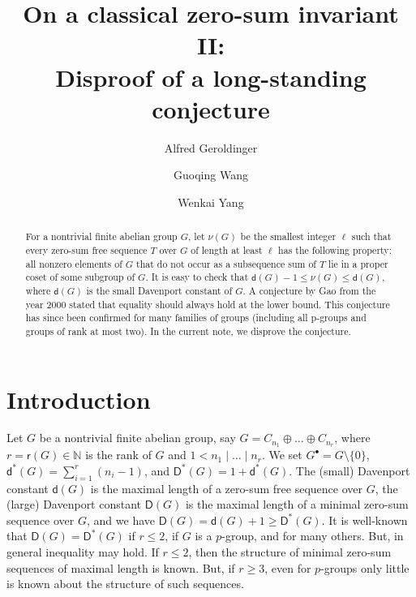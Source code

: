 \documentclass[11pt,a4paper]{amsart}
\title{On a classical zero-sum invariant II: \\ Disproof of a long-standing conjecture}
\author{Alfred Geroldinger \and Guoqing Wang \and Wenkai Yang}
\theoremstyle{plain}
\theoremstyle{definition}
\begin{document}
\maketitle

\begin{abstract}
For a nontrivial finite abelian group $G$, let $\nu(G)$ be the smallest  integer
$\ell$ such that every zero-sum free sequence $T$ over $G$ of length at least $\ell$ has the following property: all nonzero elements of $G$ that do not occur as a subsequence sum of $T$ lie in a proper coset of some subgroup of $G$. It is easy to check that $\mathsf d (G)-1 \le \nu (G) \le \mathsf d (G)$, where $\mathsf d (G)$ is the small Davenport constant of $G$. A conjecture by Gao from the year 2000 stated that equality should always hold at the lower bound. This conjecture has since been confirmed for many families of groups (including all p-groups and groups of rank at most two). In the current note, we disprove the conjecture.
\end{abstract}

\section{Introduction}


Let $G$ be a nontrivial finite abelian group, say $G = C_{n_1} \oplus \ldots \oplus C_{n_r}$, where $r=\mathsf r (G) \in \mathbb N$ is the rank of $G$ and $1 < n_1 \mid \ldots \mid n_r$. We set
$G^\bullet=G\setminus\{0\}$, $\mathsf d^* (G) = \sum_{i=1}^r (n_i-1)$, and  $\mathsf D^* (G) = 1 + \mathsf d^* (G)$. The (small) Davenport constant $\mathsf d (G)$ is the maximal length of a zero-sum free sequence over $G$,  the (large) Davenport constant $\mathsf D (G)$ is the maximal length of a minimal zero-sum sequence over $G$, and we have $\mathsf D (G) = \mathsf d (G)+1 \ge \mathsf D^* (G)$. It is well-known that $\mathsf D (G) = \mathsf D^* (G)$ if $r \le 2$, if $G$ is a $p$-group, and for many others. But, in general inequality may hold. If $r \le 2$, then the structure of minimal zero-sum sequences of maximal length is known. But, if $r \ge 3$, even for $p$-groups only little is known about the structure of such sequences.
\end{document}
